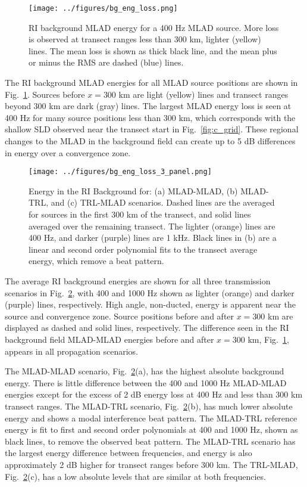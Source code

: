 \documentclass[preprint,NumberedRefs]{JASA}
\begin{document}
\begin{figure}
\texttt{[image: ../figures/bg\_eng\_loss.png]}
    \caption{RI background MLAD energy for a 400 Hz MLAD source. More loss is observed at transect ranges less than 300 km, lighter (yellow) lines. The mean loss is shown as thick black line, and the mean plus or minus the RMS are dashed (blue) lines.}
    \label{fig:bg_eng}
\end{figure}
The RI background MLAD energies for all MLAD source positions are shown in Fig.~\ref{fig:bg_eng}. Sources before $x=$300 km are light (yellow) lines and transect ranges beyond 300 km are dark (gray) lines. The largest MLAD energy loss is seen at 400 Hz for many source positions less than 300 km, which corresponds with the shallow SLD observed near the transect start in Fig.~\ref{fig:c_grid}. These regional changes to the MLAD in the background field can create up to 5 dB differences in energy over a convergence zone.

\begin{figure}
\texttt{[image: ../figures/bg\_eng\_loss\_3\_panel.png]}
        \caption{Energy in the RI Background for: (a) MLAD-MLAD, (b) MLAD-TRL, and (c) TRL-MLAD scenarios. Dashed lines are the averaged for sources in the first 300 km of the transect, and solid lines averaged over the remaining transect. The lighter (orange) lines are 400 Hz, and darker (purple) lines are 1 kHz. Black lines in (b) are a linear and second order polynomial fits to the transect average energy, which remove a beat pattern.}
    \label{fig:eng_bg_3}
\end{figure}
The average RI background energies are shown for all three transmission scenarios in Fig.~\ref{fig:eng_bg_3}, with 400 and 1000 Hz shown as lighter (orange) and darker (purple) lines, respectively. High angle, non-ducted, energy is apparent near the source and convergence zone. Source positions before and after $x=300$ km are displayed as dashed and solid lines, respectively. The difference seen in the RI background field MLAD-MLAD energies before and after $x=300$ km, Fig.~\ref{fig:bg_eng}, appears in all propagation scenarios.

The MLAD-MLAD scenario, Fig.~\ref{fig:eng_bg_3}(a), has the highest absolute background energy. There is little difference between the 400 and 1000 Hz MLAD-MLAD energies except for the excess of 2 dB energy loss at 400 Hz and less than 300 km transect ranges. The MLAD-TRL scenario, Fig.~\ref{fig:eng_bg_3}(b), has much lower absolute energy and shows a modal interference beat pattern. The MLAD-TRL reference energy is fit to first and second order polynomials at 400 and 1000 Hz, shown as black lines, to remove the observed beat pattern. The MLAD-TRL scenario has the largest energy difference between frequencies, and energy is also approximately 2 dB higher for transect ranges before 300 km. The TRL-MLAD, Fig.~\ref{fig:eng_bg_3}(c), has a low absolute levels that are similar at both frequencies.
\end{document}
